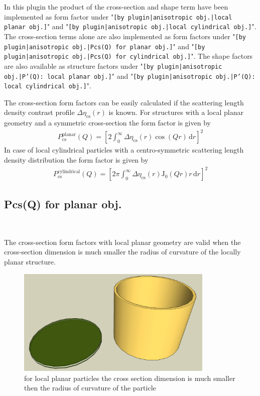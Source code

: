 In this plugin the product of the cross-section and shape term
have been implemented as form factor under "\texttt{[by
plugin|anisotropic obj.|local planar obj.]}" and "\texttt{[by
plugin|anisotropic obj.|local cylindrical obj.]}". The
cross-section terms alone are also implemented as form factors
under "\texttt{[by plugin|anisotropic obj.|Pcs(Q) for planar obj.]}"
and "\texttt{[by plugin|anisotropic obj.|Pcs(Q) for cylindrical
obj.]}". The shape factors are also available as structure factors
under "\texttt{[by plugin|anisotropic obj.|P'(Q): local planar
obj.]}" and "\texttt{[by plugin|anisotropic obj.|P'(Q): local
cylindrical obj.]}".

The cross-section form factors can be easily calculated if the
scattering length density contrast profile
$\Delta\eta_\textrm{cs}(r)$ is known. For structures with a local
planar geometry and a symmetric cross-section the form factor is
given by
\begin{align}
P_\textrm{cs}^\textrm{planar} (Q) = \left[2\int_0^\infty
\Delta\eta_\textrm{cs}(r) \cos(Qr) \, \textrm{d}r\right]^2
\label{Pcs:planar}
\end{align}
In case of local cylindrical particles with a centro-symmetric
scattering length density distribution the form factor is given by
\begin{align}
P_\textrm{cs}^\textrm{cylindrical} (Q) = \left[2\pi\int_0^\infty
\Delta\eta_\textrm{cs}(r) \textrm{J}_0(Qr)r \,
\textrm{d}r\right]^2 \label{Pcs:cylindrical}
\end{align}

\clearpage
\subsection{Pcs(Q) for planar obj.} ~\\
\label{plugin:Pcs4planar}

The cross-section form factors with local planar geometry are valid
when the cross-section dimension is much smaller the radius of curvature
of the locally planar structure.
\begin{figure}[htb]
\begin{center}
\includegraphics[width=0.838\textwidth,height=0.456\textwidth]{../images/form_factor/anisotropic/localplanar.png}
\end{center}
\caption{for local planar particles the cross section dimension is much smaller then the
radius of curvature of the particle}
\label{fig:localplanar}
\end{figure}

